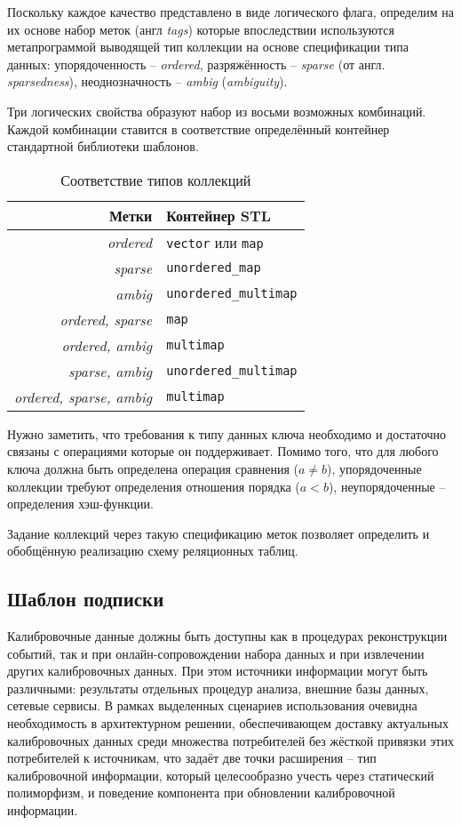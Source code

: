 Поскольку каждое качество представлено в виде логического флага, определим
на их основе набор меток (англ \emph{tags}) которые впоследствии используются
метапрограммой выводящей тип коллекции на основе спецификации типа данных:
упорядоченность -- \emph{ordered}, разряжённость -- \emph{sparse} (от
англ. \emph{sparsedness}), неоднозначность -- \emph{ambig} (\emph{ambiguity}).

Три логических свойства образуют набор из восьми возможных комбинаций. Каждой
комбинации ставится в соответствие определённый контейнер стандартной
библиотеки шаблонов.

\begin{table}[ht]
    \centering
    \begin{tabular}{r|l}
        Метки & Контейнер STL \\ \hline
        \emph{ordered} & \texttt{vector} или \texttt{map} \\
        \emph{sparse} & \texttt{unordered\_map} \\
        \emph{ambig} & \texttt{unordered\_multimap} \\
        \emph{ordered, sparse} & \texttt{map} \\
        \emph{ordered, ambig}  & \texttt{multimap} \\
        \emph{sparse, ambig} & \texttt{unordered\_multimap} \\
        \emph{ordered, sparse, ambig} & \texttt{multimap}
    \end{tabular}
    \caption{Соответствие типов коллекций}
    \label{tab:placeholder}
\end{table}

Нужно заметить, что требования к типу данных ключа необходимо и достаточно
связаны с операциями которые он поддерживает. Помимо того, что
для любого ключа должна быть определена операция
сравнения ($a \ne b$), упорядоченные коллекции требуют
определения отношения порядка ($a < b$), неупорядоченные --
определения хэш-функции.

Задание коллекций через такую спецификацию меток позволяет
определить и обобщённую реализацию схему реляционных
таблиц.

\subsection{Шаблон подписки}

Калибровочные данные должны быть доступны как в процедурах
реконструкции событий, так и при онлайн-сопровождении
набора данных и при извлечении других калибровочных данных.
При этом источники информации могут быть различными:
результаты отдельных процедур анализа, внешние базы
данных, сетевые сервисы. В рамках выделенных сценариев
использования очевидна необходимость в архитектурном решении,
обеспечивающем доставку актуальных калибровочных данных
среди множества потребителей без жёсткой привязки этих
потребителей к источникам, что задаёт две точки
расширения -- тип калибровочной информации, который
целесообразно учесть через статический полиморфизм,
и поведение компонента при обновлении калибровочной информации.

